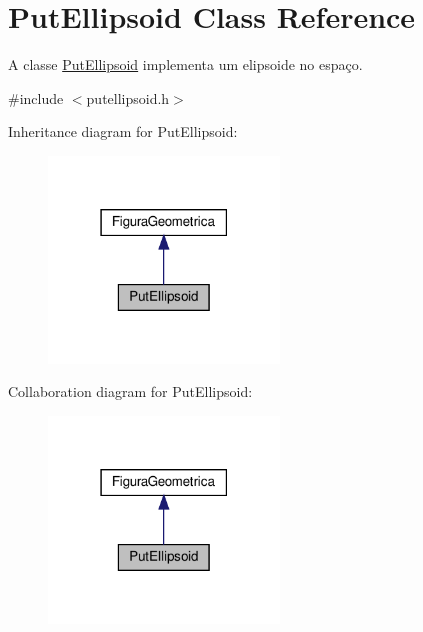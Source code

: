 \hypertarget{class_put_ellipsoid}{}\section{Put\+Ellipsoid Class Reference}
\label{class_put_ellipsoid}


A classe \hyperlink{class_put_ellipsoid}{Put\+Ellipsoid} implementa um elipsoide no espaço.  




{\ttfamily \#include $<$putellipsoid.\+h$>$}



Inheritance diagram for Put\+Ellipsoid\+:
\nopagebreak
\begin{figure}[H]
\begin{center}
\leavevmode
\includegraphics[width=174pt]{class_put_ellipsoid__inherit__graph}
\end{center}
\end{figure}


Collaboration diagram for Put\+Ellipsoid\+:
\nopagebreak
\begin{figure}[H]
\begin{center}
\leavevmode
\includegraphics[width=174pt]{class_put_ellipsoid__coll__graph}
\end{center}
\end{figure}
